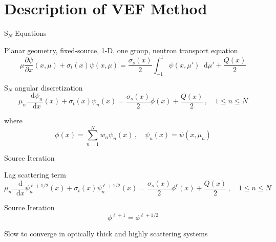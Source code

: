 \documentclass[10pt]{beamer}
\newcommand{\SN}{S$_N$\xspace}
\newcommand{\ud}{\mathop{}\!\mathrm{d}} %
\newcommand{\pderiv}[2]{\frac{\partial #1}{\partial #2}}
\newcommand{\dderiv}[2]{\frac{\ud #1}{\ud #2}}
\newcommand{\rellh}{^{\ell+1/2}} %
\newcommand{\paren}[1]{\left(#1\right)}
\begin{document}
\section{Description of VEF Method}

\begin{frame}{\SN Equations}

	Planar geometry, fixed-source, 1-D, one group, neutron transport equation 
	\begin{equation*} 
		\mu \pderiv{\psi}{x} \paren{x, \mu} + \sigma_t(x) \psi(x,\mu) = 
			\frac{\sigma_s(x)}{2} \int_{-1}^1 \psi(x,\mu') \ud \mu' + \frac{Q(x)}{2}
	\end{equation*}

	\pause
	\SN angular discretization 
	\begin{equation*} \label{eq:sn}
		\mu_n \dderiv{\psi_n}{x}(x) + \sigma_t(x) \psi_n(x) = 
		\frac{\sigma_s(x)}{2} \phi(x) + \frac{Q(x)}{2} \,, \quad 1 \leq n \leq N
	\end{equation*}

	where 
	\begin{equation*}
		\phi(x) = \sum_{n=1}^N w_n \psi_n(x) \,, \quad \psi_n(x) = \psi(x, \mu_n)
	\end{equation*}

\end{frame}

\begin{frame}{Source Iteration}

	Lag scattering term 
	\begin{equation*} \label{eq:si}
		\mu_n \dderiv{}{x}\psi_n\rellh(x) + \sigma_t(x) \psi_n\rellh(x) = 
		\frac{\sigma_s(x)}{2} \phi^\ell(x) + \frac{Q(x)}{2} \,, \quad 1 \leq n \leq N 
	\end{equation*}

	\pause
	Source Iteration 
	\begin{equation*}
		\phi^{\ell+1} = \phi\rellh
	\end{equation*}

	\pause
	Slow to converge in optically thick and highly scattering systems 

\end{frame}
\end{document}
